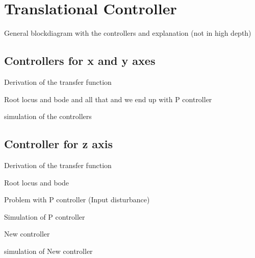 \section{Translational Controller} \label{sec:TranslationalController}

General blockdiagram with the controllers and explanation (not in high depth)

\subsection{Controllers for x and y axes}
Derivation of the transfer function

Root locus and bode and all that and we end up with P controller

simulation of the controllers
\subsection{Controller for z axis}
Derivation of the transfer function 

Root locus and bode

Problem with P controller (Input disturbance)

Simulation of P controller

New controller 

simulation of New controller

